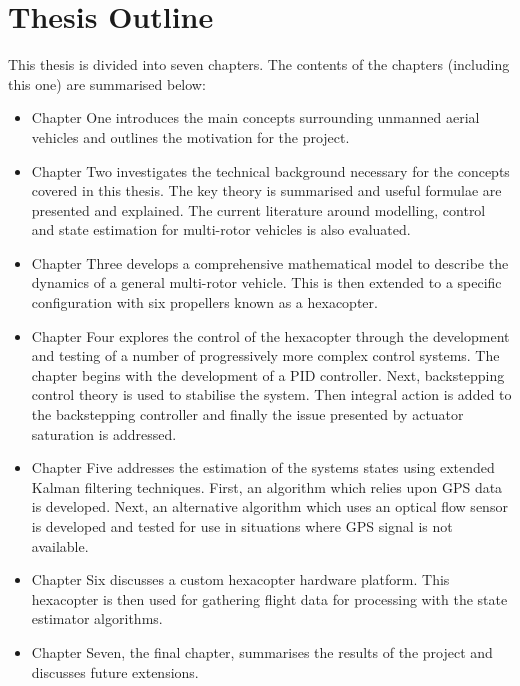 \section{Thesis Outline}
This thesis is divided into seven chapters. The contents of the chapters (including this one) are summarised below:
\begin{itemize}
\item Chapter One introduces the main concepts surrounding unmanned aerial vehicles and outlines the motivation for the project.
\item Chapter Two investigates the technical background necessary for the concepts covered in this thesis. The key theory is summarised and useful formulae are presented and explained. The current literature around modelling, control and state estimation for multi-rotor vehicles is also evaluated.
\item Chapter Three develops a comprehensive mathematical model to describe the dynamics of a general multi-rotor vehicle. This is then extended to a specific configuration  with six propellers known as a hexacopter.
\item Chapter Four explores the control of the hexacopter through the development and testing of a number of progressively more complex control systems. The chapter begins with the development of a PID controller. Next, backstepping control theory is used to stabilise the system. Then integral action is added to the backstepping controller and finally the issue presented by actuator saturation is addressed.
\item Chapter Five addresses the estimation of the systems states using extended Kalman filtering techniques. First, an algorithm which relies upon GPS data is developed. Next, an alternative algorithm which uses an optical flow sensor is developed and tested for use in situations where GPS signal is not available.
\item Chapter Six discusses a custom hexacopter hardware platform. This hexacopter is then used for gathering flight data for processing with the state estimator algorithms.
\item Chapter Seven, the final chapter, summarises the results of the project and discusses future extensions.
\end{itemize}

\clearpage


